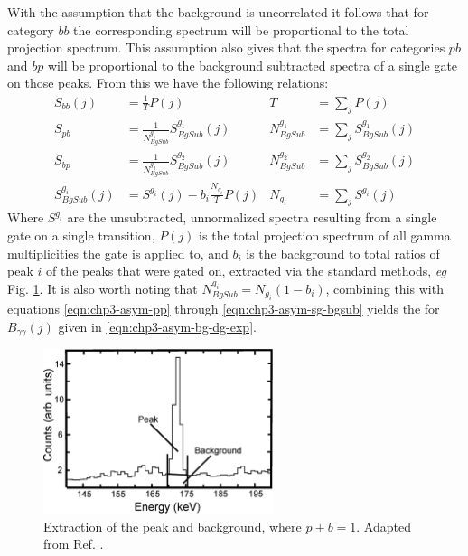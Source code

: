 With the assumption that the background is uncorrelated it follows that for category $bb$ the corresponding spectrum will be proportional to the total projection spectrum. This assumption also gives that the spectra for categories $pb$ and $bp$ will be proportional to the background subtracted spectra of a single gate on those peaks. From this we have the following relations:
\begin{align}
S_{bb}(j) &=\frac{1}{T}P(j) & T &= \sum\limits_{j}^{}P(j) \label{eqn:chp3-asym-bb}\\
S_{pb} &= \frac{1}{N^{g_1}_{BgSub}}S^{g_1}_{BgSub}(j)  & N^{g_1}_{BgSub} &= \sum\limits_{j}^{}S^{g_1}_{BgSub}(j) \label{eqn:chp3-asym-bp}\\
S_{bp} &= \frac{1}{N^{g_2}_{BgSub}}S^{g_2}_{BgSub}(j)  & N^{g_2}_{BgSub} &= \sum\limits_{j}^{}S^{g_2}_{BgSub}(j) \label{eqn:chp3-asym-pb}\\
S^{g_i}_{BgSub}(j) &= S^{g_i}(j) - b_i \frac{N_{g_i}}{T}P(j) & N_{g_i} &=  \sum\limits_{j}^{}S^{g_i}(j)  \label{eqn:chp3-asym-sg-bgsub}
\end{align}
Where $S^{g_i}$ are the unsubtracted, unnormalized spectra resulting from a single gate on a single transition, $P(j)$ is the total projection spectrum of all gamma multiplicities the gate is applied to, and $b_i$ is the background to total ratios of peak $i$ of the peaks that were gated on, extracted via the standard methods, \emph{eg} Fig. \ref{fig:chp3-asym-bg-ratio}. It is also worth noting that $N^{g_i}_{BgSub} = N_{g_i}(1 - b_i)$, combining this with equations \ref{eqn:chp3-asym-pp} through \ref{eqn:chp3-asym-sg-bgsub} yields the for $B_{\gamma{}\gamma{}}(j)$ given in \ref{eqn:chp3-asym-bg-dg-exp}.

\begin{figure}[h!]
	\centerline{\includegraphics[width=0.6\textwidth]{./img/c3/peak_to_bg_asym_bg.eps}}
	\caption{Extraction of the peak and background, where $p + b = 1$. Adapted from Ref. \cite{asymBGSub}.}
	\label{fig:chp3-asym-bg-ratio}
\end{figure}

